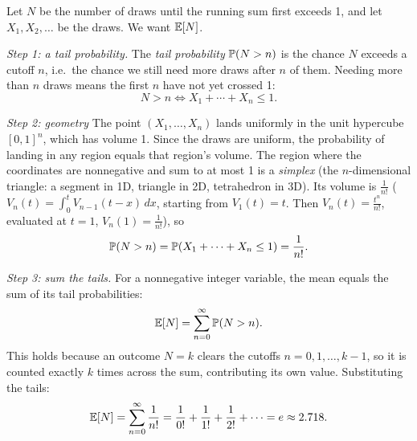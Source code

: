 \begin{solution}
Let $N$ be the number of draws until the running sum first exceeds 1, and let $X_1, X_2, \dots$ be the draws. We want $\mathbb{E}[N]$.

\medskip
\textit{Step 1: a tail probability.} The \textit{tail probability} $\mathbb{P}(N > n)$ is the chance $N$ exceeds a cutoff $n$, i.e.\ the chance we still need more draws after $n$ of them. Needing more than $n$ draws means the first $n$ have not yet crossed 1:
\[
N > n \iff X_1 + \cdots + X_n \leq 1.
\]

\textit{Step 2: geometry} The point $(X_1, \dots, X_n)$ lands uniformly in the unit hypercube $[0,1]^n$, which has volume 1. Since the draws are uniform, the probability of landing in any region equals that region's volume. The region where the coordinates are nonnegative and sum to at most 1 is a \textit{simplex} (the $n$-dimensional triangle: a segment in 1D, triangle in 2D, tetrahedron in 3D). Its volume is $\frac{1}{n!}$ ($V_n(t) = \int_0^t V_{n-1}(t-x)\,dx$, starting from $V_1(t) = t$. Then $V_n(t) = \frac{t^n}{n!}$, evaluated at $t=1$, $V_n(1)= \frac{1}{n!}$), so
\[
\mathbb{P}(N > n) = \mathbb{P}(X_1 + \cdots + X_n \leq 1) = \frac{1}{n!}.
\]

\textit{Step 3: sum the tails.} For a nonnegative integer variable, the mean equals the sum of its tail probabilities:
\[
\mathbb{E}[N] = \sum_{n=0}^{\infty} \mathbb{P}(N > n).
\]
This holds because an outcome $N = k$ clears the cutoffs $n = 0, 1, \dots, k-1$, so it is counted exactly $k$ times across the sum, contributing its own value. Substituting the tails:
\[
\mathbb{E}[N] = \sum_{n=0}^{\infty} \frac{1}{n!} = \frac{1}{0!} + \frac{1}{1!} + \frac{1}{2!} + \cdots = e \approx 2.718.
\]
\end{solution}
